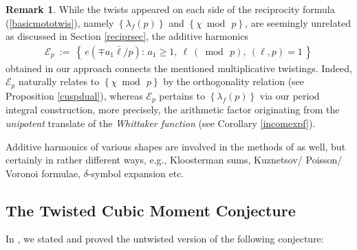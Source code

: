 \documentclass[11pt,reqno]{amsart}
\theoremstyle{definition}
\theoremstyle{definition}
\newtheorem{rem}[thm]{Remark}
\theoremstyle{remark}
\numberwithin{equation}{section}
\begin{document}
 
\begin{rem}\label{reas}
	While the twists appeared on each side of the reciprocity formula (\ref{basicmototwis}),  namely $\left\{\lambda_{f}(p)\right\}$ and  $\left\{\chi  \bmod\, p\right\}$,  are seemingly unrelated as discussed in Section \ref{reciprsec},  the additive harmonics
	\begin{align}\label{addharper}
		\mathcal{E}_{p} \ := \  \left\{ \, e(\mp a_{1}\bar{\ell}/p): \, a_{1}\ge 1,\  \ell \ (\bmod\, p),\  (\ell, p)=1\, \right\}
	\end{align}
	obtained in our approach  connects the mentioned multiplicative twistings. Indeed,  $\mathcal{E}_{p}$ naturally relates to $\left\{\chi  \bmod\, p\right\}$ by the orthogonality relation (see Proposition \ref{cuspdual}), whereas  $\mathcal{E}_{p}$ pertains to   $\left\{\lambda_{f}(p)\right\}$  via  our period integral construction, more precisely,   the arithmetic factor  originating from the \textit{unipotent} translate of the \textit{Whittaker function} (see Corollary \ref{incomexpf}). 
	
	Additive harmonics of various shapes are involved in the methods of \cite{Y11, BHKM20}  as well,  but certainly in rather different ways, e.g.,  Kloosterman sums, Kuznetsov/ Poisson/ Voronoi formulae, $\delta$-symbol expansion etc. 
\end{rem}		








	\subsection{The Twisted Cubic Moment Conjecture}
	
	In \cite{Kw23a+}, we stated and proved the untwisted version of the following conjecture:
	
\end{document}
